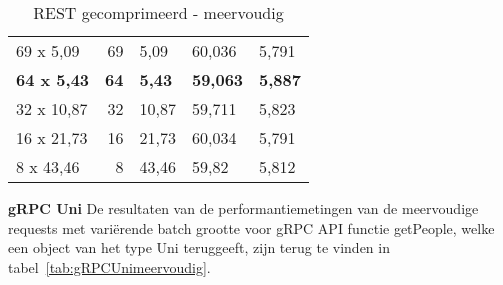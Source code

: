 \begin{table}
\begin{tabular}{lrlll}
        69 x 5,09 & 69 & 5,09 & 60,036 & 5,791 \\
        \textbf{64 x 5,43} & \textbf{64} & \textbf{5,43} & \textbf{59,063} & \textbf{5,887} \\
        32 x 10,87 & 32 & 10,87 & 59,711 & 5,823 \\
        16 x 21,73 & 16 & 21,73 & 60,034 & 5,791 \\
        8 x 43,46 & 8 & 43,46 & 59,82 & 5,812 \\
        \bottomrule
    \end{tabular}
    \caption{REST gecomprimeerd - meervoudig}
    \label{tab:RESTcompressiemeervoudig}
\end{table}

\textbf{gRPC Uni}\newline
De resultaten van de performantiemetingen van de meervoudige requests met vari\"erende batch grootte voor gRPC API functie getPeople, welke een object van het type Uni teruggeeft, zijn
terug te vinden in tabel~\ref{tab:gRPCUnimeervoudig}.

